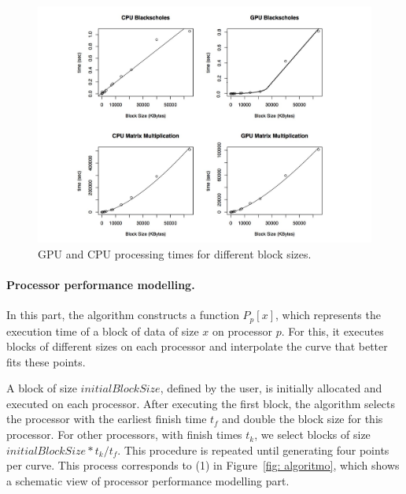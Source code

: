 \documentclass[journal]{IEEEtran}
\begin{document}
%

\begin{figure}[!t]
	\centering
			\includegraphics[scale=0.36]{CPUVersusGPULinear2.pdf} 				
	\caption{GPU and CPU processing times for different block sizes.}
	\label{fig: CPUVersusGPU1}
\end{figure}


\vspace{0.2cm}
\paragraph*{Processor performance modelling.} In this part, the algorithm 
constructs a function $P_p[x]$, which represents the execution time of a block
of data of size $x$ on processor $p$. For this, it executes blocks of different
sizes on each processor and interpolate the curve that better fits these points.

A block of size $initialBlockSize$, defined by the user, is initially allocated
and executed on each processor. After executing the first block, the algorithm
selects the processor with the earliest finish time $t_f$ and double the block
size for this processor. For other processors, with finish times $t_k$, we
select blocks of size $initialBlockSize * t_k / t_f$. This procedure is repeated
until generating four points per curve. This process corresponds to (1) in
Figure~\ref{fig: algoritmo}, which shows a schematic view of processor
performance modelling part.
\end{document}
